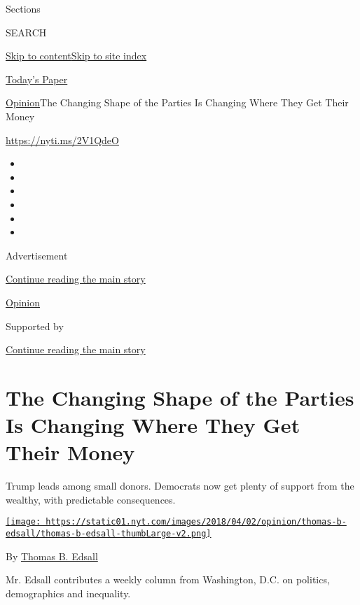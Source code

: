 Sections

SEARCH

\protect\hyperlink{site-content}{Skip to
content}\protect\hyperlink{site-index}{Skip to site index}

\href{https://myaccount.nytimes.com/auth/login?response_type=cookie\&client_id=vi}{}

\href{https://www.nytimes.com/section/todayspaper}{Today's Paper}

\href{/section/opinion}{Opinion}\textbar{}The Changing Shape of the
Parties Is Changing Where They Get Their Money

\href{https://nyti.ms/2V1QdeO}{https://nyti.ms/2V1QdeO}

\begin{itemize}
\item
\item
\item
\item
\item
\item
\end{itemize}

Advertisement

\protect\hyperlink{after-top}{Continue reading the main story}

\href{/section/opinion}{Opinion}

Supported by

\protect\hyperlink{after-sponsor}{Continue reading the main story}

\hypertarget{the-changing-shape-of-the-parties-is-changing-where-they-get-their-money}{%
\section{The Changing Shape of the Parties Is Changing Where They Get
Their
Money}\label{the-changing-shape-of-the-parties-is-changing-where-they-get-their-money}}

Trump leads among small donors. Democrats now get plenty of support from
the wealthy, with predictable consequences.

\href{https://www.nytimes.com/by/thomas-b-edsall}{\texttt{[image: https://static01.nyt.com/images/2018/04/02/opinion/thomas-b-edsall/thomas-b-edsall-thumbLarge-v2.png]}}

By \href{https://www.nytimes.com/by/thomas-b-edsall}{Thomas B. Edsall}

Mr. Edsall contributes a weekly column from Washington, D.C. on
politics, demographics and inequality.

